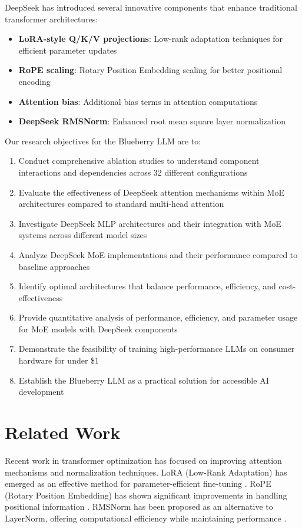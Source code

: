 \documentclass[11pt,a4paper]{article}
\begin{document}
DeepSeek has introduced several innovative components that enhance traditional transformer architectures:
\begin{itemize}
    \item \textbf{LoRA-style Q/K/V projections}: Low-rank adaptation techniques for efficient parameter updates
    \item \textbf{RoPE scaling}: Rotary Position Embedding scaling for better positional encoding
    \item \textbf{Attention bias}: Additional bias terms in attention computations
    \item \textbf{DeepSeek RMSNorm}: Enhanced root mean square layer normalization
\end{itemize}

Our research objectives for the Blueberry LLM are to:
\begin{enumerate}
    \item Conduct comprehensive ablation studies to understand component interactions and dependencies across 32 different configurations
    \item Evaluate the effectiveness of DeepSeek attention mechanisms within MoE architectures compared to standard multi-head attention
    \item Investigate DeepSeek MLP architectures and their integration with MoE systems across different model sizes
    \item Analyze DeepSeek MoE implementations and their performance compared to baseline approaches
    \item Identify optimal architectures that balance performance, efficiency, and cost-effectiveness
    \item Provide quantitative analysis of performance, efficiency, and parameter usage for MoE models with DeepSeek components
    \item Demonstrate the feasibility of training high-performance LLMs on consumer hardware for under \$1
    \item Establish the Blueberry LLM as a practical solution for accessible AI development
\end{enumerate}

\section{Related Work}

Recent work in transformer optimization has focused on improving attention mechanisms and normalization techniques. LoRA (Low-Rank Adaptation) has emerged as an effective method for parameter-efficient fine-tuning \cite{hu2021lora}. RoPE (Rotary Position Embedding) has shown significant improvements in handling positional information \cite{su2021roformer}. RMSNorm has been proposed as an alternative to LayerNorm, offering computational efficiency while maintaining performance \cite{zhang2019root}.
\end{document}
